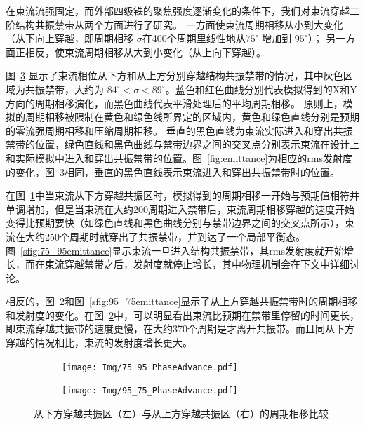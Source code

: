 在束流流强固定，而外部四级铁的聚焦强度逐渐变化的条件下，我们对束流穿越二阶结构共振禁带从两个方面进行了研究。
一方面使束流周期相移从小到大变化（从下向上穿越，即周期相移 $\sigma$在400个周期里线性地从$75^{\circ}$ 增加到 $95^{\circ}$）；
另一方面正相反，使束流周期相移从大到小变化（从上向下穿越）。

图~\ref{fig:phase_advance} 显示了束流相位从下方和从上方分别穿越结构共振禁带的情况，其中灰色区域为共振禁带，大约为 $84^ {\circ}<\sigma<89^{\circ}$。蓝色和红色曲线分别代表模拟得到的X和Y方向的周期相移演化，而黑色曲线代表平滑处理后的平均周期相移。
原则上，模拟的周期相移被限制在黄色和绿色线所界定的区域内，黄色和绿色直线分别是预期的零流强周期相移和压缩周期相移。 垂直的黑色直线为束流实际进入和穿出共振禁带的位置，绿色直线和黑色曲线与禁带边界之间的交叉点分别表示束流在设计上和实际模拟中进入和穿出共振禁带的位置。图~\ref{fig:emittance}为相应的rms发射度的变化，图~\ref{fig:phase_advance}相同，垂直的黑色直线表示束流进入和穿出共振禁带时的位置。

在图~\ref{sfig:75_95phase}中当束流从下方穿越共振区时，模拟得到的周期相移一开始与预期值相符并单调增加，但是当束流在大约200周期进入禁带后，束流周期相移穿越的速度开始变得比预期要快（如绿色直线和黑色曲线分别与禁带边界之间的交叉点所示），束流在大约250个周期时就穿出了共振禁带，并到达了一个局部平衡态。
图~\ref{sfig:75_95emittance}显示束流一旦进入结构共振禁带，其rms发射度就开始增长，而在束流穿越禁带之后，发射度就停止增长，其中物理机制会在下文中详细讨论。

相反的，图~\ref{sfig:95_75phase}和图~\ref{sfig:95_75emittance}显示了从上方穿越共振禁带时的周期相移和发射度的变化。在图~\ref{sfig:95_75phase}中，可以明显看出束流比预期在禁带里停留的时间更长，即束流穿越共振带的速度更慢，在大约370个周期是才离开共振带。而且同从下方穿越的情况相比，束流的发射度增长更大。

\begin{figure}[thbp]
    \centering
    \begin{subfigure}[b]{0.48\textwidth}
        \centering
        \texttt{[image: Img/75\_95\_PhaseAdvance.pdf]}
        \caption{}
        \label{sfig:75_95phase}
    \end{subfigure}
    \begin{subfigure}[b]{0.48\textwidth}
        \centering
        \texttt{[image: Img/95\_75\_PhaseAdvance.pdf]}
        \caption{}
        \label{sfig:95_75phase}
    \end{subfigure}
    \caption{从下方穿越共振区（左）与从上方穿越共振区（右）的周期相移比较}
    \label{fig:phase_advance}
\end{figure}

